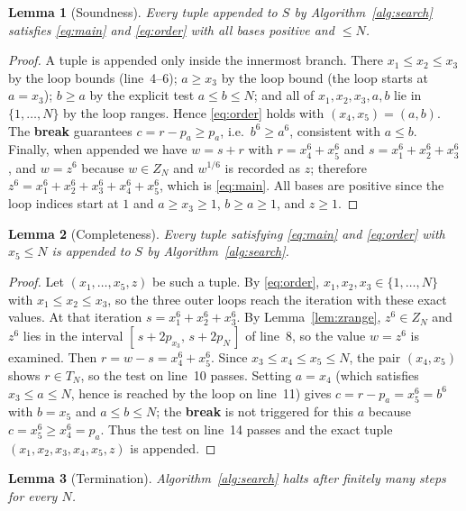 \documentclass{amsart}
\newtheorem{lemma}{Lemma}
\begin{document}
\begin{lemma}[Soundness]\label{lem:sound}
Every tuple appended to $S$ by Algorithm~\ref{alg:search} satisfies
\eqref{eq:main} and \eqref{eq:order} with all bases positive and
$\le N$.
\end{lemma}

\begin{proof}
A tuple is appended only inside the innermost branch. There $x_1\le x_2
\le x_3$ by the loop bounds (line~4--6); $a\ge x_3$ by the loop bound
(the loop starts at $a=x_3$); $b\ge a$ by the explicit test $a\le b\le
N$; and all of $x_1,x_2,x_3,a,b$ lie in $\{1,\dots,N\}$ by the loop
ranges. Hence \eqref{eq:order} holds with $(x_4,x_5)=(a,b)$. The
\textbf{break} guarantees $c=r-p_a\ge p_a$, i.e.\ $b^6\ge a^6$,
consistent with $a\le b$. Finally, when appended we have
$w=s+r$ with $r=x_4^6+x_5^6$ and $s=x_1^6+x_2^6+x_3^6$, and $w=z^6$
because $w\in Z_N$ and $w^{1/6}$ is recorded as $z$; therefore
$z^6=x_1^6+x_2^6+x_3^6+x_4^6+x_5^6$, which is \eqref{eq:main}. All bases
are positive since the loop indices start at $1$ and $a\ge x_3\ge 1$,
$b\ge a\ge 1$, and $z\ge 1$.
\end{proof}

\begin{lemma}[Completeness]\label{lem:complete}
Every tuple satisfying \eqref{eq:main} and \eqref{eq:order} with
$x_5\le N$ is appended to $S$ by Algorithm~\ref{alg:search}.
\end{lemma}

\begin{proof}
Let $(x_1,\dots,x_5,z)$ be such a tuple. By
\eqref{eq:order}, $x_1,x_2,x_3\in\{1,\dots,N\}$ with $x_1\le x_2\le x_3$,
so the three outer loops reach the iteration with these exact values.
At that iteration $s=x_1^6+x_2^6+x_3^6$. By Lemma~\ref{lem:zrange},
$z^6\in Z_N$ and $z^6$ lies in the interval $[\,s+2p_{x_3},\,s+2p_N\,]$
of line~8, so the value $w=z^6$ is examined. Then
$r=w-s=x_4^6+x_5^6$. Since $x_3\le x_4\le x_5\le N$, the pair
$(x_4,x_5)$ shows $r\in T_N$, so the test on line~10 passes. Setting
$a=x_4$ (which satisfies $x_3\le a\le N$, hence is reached by the loop
on line~11) gives $c=r-p_a=x_5^6=b^6$ with $b=x_5$ and $a\le b\le N$;
the \textbf{break} is not triggered for this $a$ because $c=x_5^6\ge
x_4^6=p_a$. Thus the test on line~14 passes and the exact tuple
$(x_1,x_2,x_3,x_4,x_5,z)$ is appended.
\end{proof}

\begin{lemma}[Termination]\label{lem:term}
Algorithm~\ref{alg:search} halts after finitely many steps for every
$N$.
\end{lemma}
\end{document}
